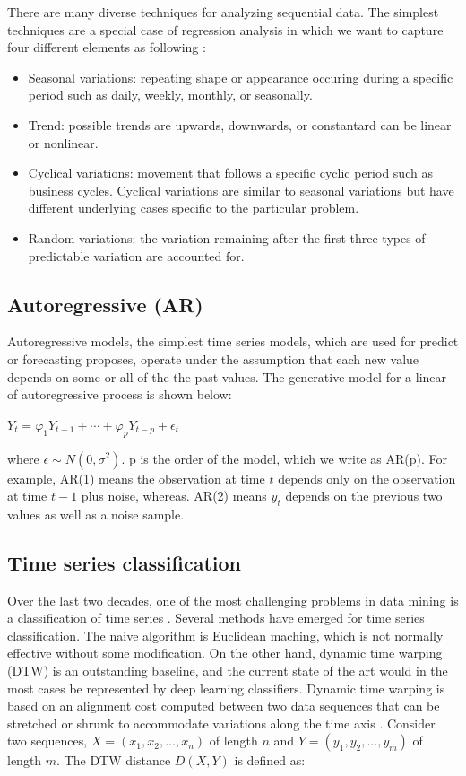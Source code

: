 There are many diverse techniques for analyzing sequential data. The simplest techniques are a special case of regression analysis in which we want to capture four different elements as following \cite{dash_2020}:
\begin{itemize}
  \item Seasonal variations: repeating shape or appearance occuring during a specific period such as daily, weekly, monthly, or seasonally.
  \item Trend: possible trends are upwards, downwards, or constantard can be linear or nonlinear.
  \item Cyclical variations: movement that follows a specific cyclic period such as business cycles. Cyclical variations are similar to seasonal variations but have different underlying cases specific to the particular problem.
  \item Random variations: the variation remaining after the first three types of predictable variation are accounted for.
\end{itemize}

\subsection{Autoregressive (AR)}

Autoregressive models, the simplest time series models, which are used for predict or forecasting proposes, operate under the assumption that each new value depends on some or all of the the past values. The generative model for a linear of autoregressive process is shown below:

\hfil $Y_t = \varphi_1Y_{t-1} + \cdots + \varphi_pY_{t-p} + \epsilon_t $ \par

where $\epsilon \sim N(0, \sigma^2)$. p is the order of the model, which we write as AR(p). For example, AR(1) means the observation at time $t$ depends only on the observation at time $t-1$ plus noise, whereas. AR(2) means $y_t$ depends on the previous two values as well as a noise sample.

\subsection{Time series classification}

Over the last two decades, one of the most challenging problems in data mining is a classification of time series \cite{ismail_fawaz_forestier_weber_idoumghar_muller_2019}. Several methods have emerged for time series classification. The naive algorithm is Euclidean maching, which is not normally effective without some modification. On the other hand, dynamic time warping (DTW) is an outstanding baseline, and the current state of the art would in the most cases be represented by deep learning classifiers. Dynamic time warping is based on an alignment cost computed between two data sequences that can be stretched or shrunk to accommodate variations along the time axis \cite{meinard_2007, toyoda_sakurai_2012}. Consider two sequences, $X = (x_1, x_2, ..., x_n)$ of length $n$ and $Y = (y_1, y_2, ..., y_m)$ of length $m$. The DTW distance $D(X,Y)$ is defined as:

